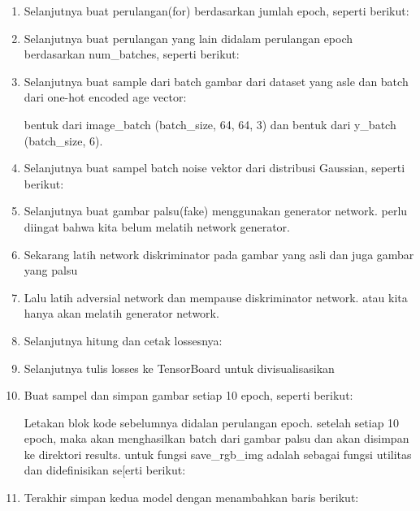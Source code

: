 \begin{enumerate}
\item Selanjutnya buat perulangan(for) berdasarkan jumlah epoch, seperti berikut:


\item Selanjutnya buat perulangan yang lain didalam perulangan epoch berdasarkan num\_batches, seperti berikut:


\item Selanjutnya buat sample dari batch gambar dari dataset yang asle dan batch dari one-hot encoded age vector:

bentuk dari image\_batch (batch\_size, 64, 64, 3) dan bentuk dari y\_batch (batch\_size, 6).

\item Selanjutnya buat sampel batch noise vektor dari distribusi Gaussian, seperti berikut:


\item Selanjutnya buat gambar palsu(fake) menggunakan generator network. perlu diingat bahwa kita belum melatih network generator.


\item Sekarang latih network diskriminator pada gambar yang asli dan juga gambar yang palsu


\item Lalu latih adversial network dan mempause diskriminator network. atau kita hanya akan melatih generator network.


\item Selanjutnya hitung dan cetak lossesnya:


\item Selanjutnya tulis losses ke TensorBoard untuk divisualisasikan  


\item Buat sampel dan simpan gambar setiap 10 epoch, seperti berikut:

Letakan blok kode sebelumnya didalan perulangan epoch. setelah setiap 10 epoch, maka akan menghasilkan batch dari gambar palsu dan akan disimpan ke direktori results. untuk fungsi save\_rgb\_img adalah sebagai fungsi utilitas dan didefinisikan se[erti berikut:


\item Terakhir simpan kedua model dengan menambahkan baris berikut:


\end{enumerate}

